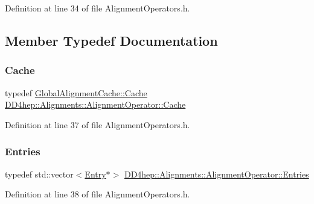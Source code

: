 Definition at line 34 of file Alignment\+Operators.\+h.



\subsection{Member Typedef Documentation}
\hypertarget{class_d_d4hep_1_1_alignments_1_1_alignment_operator_aa2e6502de3afb25286845cae785ab1d7}{}\label{class_d_d4hep_1_1_alignments_1_1_alignment_operator_aa2e6502de3afb25286845cae785ab1d7} 
\subsubsection{\texorpdfstring{Cache}{Cache}}
{\footnotesize\ttfamily typedef \hyperlink{class_d_d4hep_1_1_alignments_1_1_global_alignment_cache_a51cc6e8b7d9d85cfc296e8db7f360604}{Global\+Alignment\+Cache\+::\+Cache} \hyperlink{class_d_d4hep_1_1_alignments_1_1_alignment_operator_aa2e6502de3afb25286845cae785ab1d7}{D\+D4hep\+::\+Alignments\+::\+Alignment\+Operator\+::\+Cache}}



Definition at line 37 of file Alignment\+Operators.\+h.

\hypertarget{class_d_d4hep_1_1_alignments_1_1_alignment_operator_ada83b10531c5774c75f6e8c224f55f4c}{}\label{class_d_d4hep_1_1_alignments_1_1_alignment_operator_ada83b10531c5774c75f6e8c224f55f4c} 
\subsubsection{\texorpdfstring{Entries}{Entries}}
{\footnotesize\ttfamily typedef std\+::vector$<$\hyperlink{class_d_d4hep_1_1_alignments_1_1_alignment_operator_a0dc91b46151c3685f152574147339899}{Entry}$\ast$$>$ \hyperlink{class_d_d4hep_1_1_alignments_1_1_alignment_operator_ada83b10531c5774c75f6e8c224f55f4c}{D\+D4hep\+::\+Alignments\+::\+Alignment\+Operator\+::\+Entries}}



Definition at line 38 of file Alignment\+Operators.\+h.

